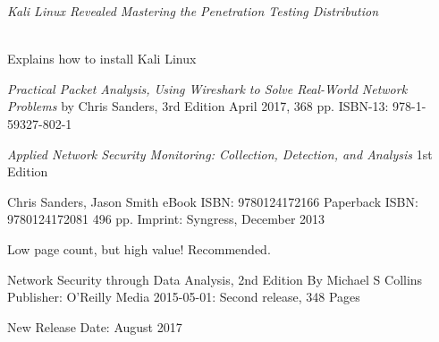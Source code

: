 \documentclass[Screen16to9,17pt]{foils}
\begin{document}

\emph{Kali Linux Revealed  Mastering the Penetration Testing Distribution}

\\
Explains how to install Kali Linux





\emph{Practical Packet Analysis,
Using Wireshark to Solve Real-World Network Problems}
by Chris Sanders, 3rd Edition
April 2017, 368 pp.
ISBN-13:
978-1-59327-802-1





\emph{Applied Network Security Monitoring: Collection, Detection, and Analysis}
1st Edition

Chris Sanders, Jason Smith
eBook ISBN: 9780124172166
Paperback ISBN: 9780124172081 496 pp.
Imprint: Syngress, December 2013

{\footnotesize{}}




Low page count, but high value! Recommended.

Network Security through Data Analysis, 2nd Edition
By Michael S Collins
Publisher: O'Reilly Media
2015-05-01: Second release, 348 Pages

New Release Date: August 2017
\end{document}
